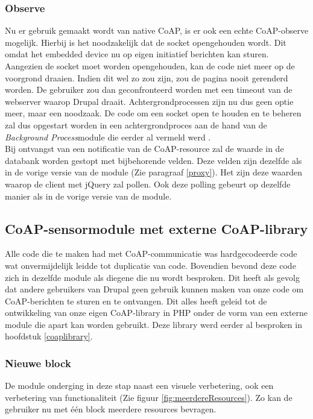 \subsubsection{Observe}
Nu er gebruik gemaakt wordt van native CoAP, is er ook een echte CoAP-observe mogelijk. Hierbij is het noodzakelijk dat de socket opengehouden wordt. Dit omdat het embedded device nu op eigen initiatief berichten kan sturen. Aangezien de socket moet worden opengehouden, kan de code niet meer op de voorgrond draaien. Indien dit wel zo zou zijn, zou de pagina nooit gerenderd worden. De gebruiker zou dan geconfronteerd worden met een timeout van de webserver waarop Drupal draait. Achtergrondprocessen zijn nu dus geen optie meer, maar een noodzaak. De code om een socket open te houden en te beheren zal dus opgestart worden in een achtergrondproces aan de hand van de \textit{Background Process}module die eerder al vermeld werd \cite{backgroundProcessModule}.\\
Bij ontvangst van een notificatie van de CoAP-resource zal de waarde in de databank worden gestopt met bijbehorende velden. Deze velden zijn dezelfde als in de vorige versie van de module (Zie paragraaf \ref{proxy}). Het zijn deze waarden waarop de client met jQuery zal pollen. Ook deze polling gebeurt op dezelfde manier als in de vorige versie van de module.

\subsection{CoAP-sensormodule met externe CoAP-library}
Alle code die te maken had met CoAP-communicatie was hardgecodeerde code wat onvermijdelijk leidde tot duplicatie van code. Bovendien bevond deze code zich in dezelfde module als diegene die nu wordt besproken. Dit heeft als gevolg dat andere gebruikers van Drupal geen gebruik kunnen maken van onze code om CoAP-berichten te sturen en te ontvangen. Dit alles heeft geleid tot de ontwikkeling van onze eigen CoAP-library in PHP onder de vorm van een externe module die apart kan worden gebruikt. Deze library werd eerder al besproken in hoofdstuk \ref{coaplibrary}.\\

\subsubsection{Nieuwe block}
De module onderging in deze stap naast een visuele verbetering, ook een verbetering van functionaliteit (Zie figuur \ref{fig:meerdereResources}). Zo kan de gebruiker nu met \'{e}\'{e}n block meerdere resources bevragen.\\

